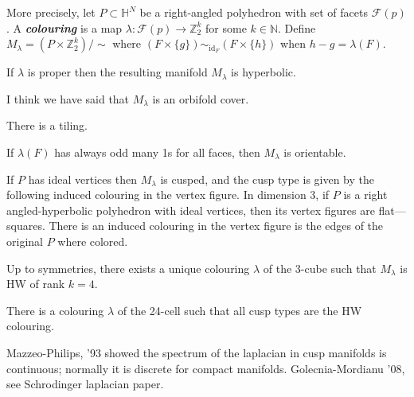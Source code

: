 More precisely, let $P \subset \mathbb{H}^N$ be a right-angled polyhedron with set of facets $\mathcal{F}(p)$. A \textit{\textbf{colouring}} is a map $\lambda:\mathcal{F}(p) \to \mathbb{Z}^k_2$ for some $k \in \mathbb{N}$. Define $M_\lambda = (P \times \mathbb{Z}_2^k)/\sim$ where $(F\times \{ g\})\sim_{\operatorname{id}_F} (F\times \{ h\})$ when $h-g=\lambda(F)$.

\begin{prop}\leavevmode
	If $\lambda$ is proper then the resulting manifold $M_\lambda$ is hyperbolic.
\end{prop}

\begin{remark}\leavevmode
	I think we have said that $M_\lambda$ is an orbifold cover.
\end{remark}

\begin{remark}[Misha]\leavevmode
	There is a tiling.
\end{remark}

\begin{prop}\leavevmode
If $\lambda(F)$ has always odd many 1s for all faces, then $M_\lambda$ is orientable.
\end{prop}

\begin{prop}\leavevmode
	If $P$ has ideal vertices then $M_\lambda$ is cusped, and the cusp type is given by the following induced colouring in the vertex figure. In dimension 3, if $P$ is a right angled-hyperbolic polyhedron with ideal vertices, then its vertex figures are flat---squares. There is an induced colouring in the vertex figure is the edges of the original $P$ where colored.
\end{prop}

\begin{prop}\leavevmode
	Up to symmetries, there exists a unique colouring $\lambda$ of the 3-cube such that $M_\lambda$ is HW of rank $k=4$.
\end{prop}

\begin{thm}\leavevmode
	There is a colouring $\lambda$ of the 24-cell such that all cusp types are the HW colouring.
\end{thm}

\begin{remark}\leavevmode
	Mazzeo-Philips, '93 showed the spectrum of the laplacian in cusp manifolds is continuous; normally it is discrete for compact manifolds. Golecnia-Mordianu '08, see Schrodinger laplacian paper.
\end{remark}


